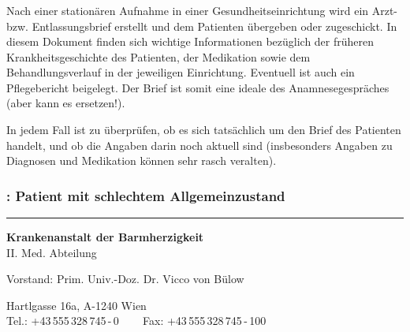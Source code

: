 \subsubsection{}

Nach einer stationären Aufnahme in einer
Gesundheitseinrichtung wird ein Arzt- bzw. Entlassungsbrief
erstellt und dem Patienten übergeben oder zugeschickt. In
diesem Dokument finden sich wichtige Informationen bezüglich
der früheren Krankheitsgeschichte des Patienten, der
Medikation sowie dem Behandlungsverlauf in der jeweiligen
Einrichtung. Eventuell ist auch ein Pflegebericht beigelegt.
Der Brief ist somit eine ideale  des
Anamnesegespräches (aber kann es  ersetzen!).

In jedem Fall ist zu überprüfen, ob es sich tatsächlich um
den Brief des Patienten handelt, und ob die Angaben darin
noch aktuell sind (insbesonders Angaben zu Diagnosen und
Medikation können sehr rasch veralten).

\subsubsection{: Patient mit schlechtem
Allgemeinzustand}

\hrule

\vspace{1em}

\begin{center}\sffamily
 \textbf{Krankenanstalt der Barmherzigkeit} 
 \\II. Med. Abteilung 
 
Vorstand: Prim. Univ.-Doz. Dr. Vicco von Bülow
 
{\scriptsize Hartlgasse 16a, A-1240 Wien
\\
Tel.: +43\,555\,328\,745\,-\,0 ~~~ Fax: +43\,555\,328\,745\,-\,100}
\end{center}

